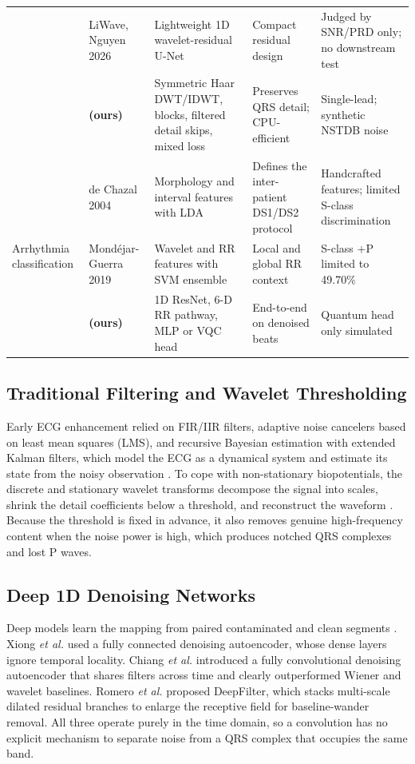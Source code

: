 \begin{table}[!t]
\begin{tabular}{@{}p{2.0cm}p{3.1cm}p{3.9cm}p{3.3cm}p{4.0cm}@{}}
& LiWave, Nguyen 2026 \cite{nguyen2026liwave} & Lightweight 1D wavelet-residual U-Net & Compact residual design & Judged by SNR/PRD only; no downstream test \\
& \textbf{\HSL{} (ours)} & Symmetric Haar DWT/IDWT, \RSE{} blocks, filtered detail skips, mixed loss & Preserves QRS detail; CPU-efficient & Single-lead; synthetic NSTDB noise \\
\midrule
\multirow{3}{2.0cm}{Arrhythmia classification}
& de Chazal 2004 \cite{dechazal2004} & Morphology and interval features with LDA & Defines the inter-patient DS1/DS2 protocol & Handcrafted features; limited S-class discrimination \\
& Mond{\'e}jar-Guerra 2019 \cite{mondejar2019} & Wavelet and RR features with SVM ensemble & Local and global RR context & S-class +P limited to 49.70\% \\
& \textbf{\RRN{} (ours)} & 1D ResNet, 6-D RR pathway, MLP or VQC head & End-to-end on denoised beats & Quantum head only simulated \\
\bottomrule
\end{tabular}
\end{table}

\subsection{Traditional Filtering and Wavelet Thresholding}
Early ECG enhancement relied on FIR/IIR filters, adaptive noise cancelers based on least mean squares (LMS), and recursive Bayesian estimation with extended Kalman filters, which model the ECG as a dynamical system and estimate its state from the noisy observation \cite{clifford2006,goldberger2000}. To cope with non-stationary biopotentials, the discrete and stationary wavelet transforms decompose the signal into scales, shrink the detail coefficients below a threshold, and reconstruct the waveform \cite{clifford2006}. Because the threshold is fixed in advance, it also removes genuine high-frequency content when the noise power is high, which produces notched QRS complexes and lost P waves.

\subsection{Deep 1D Denoising Networks}
Deep models learn the mapping from paired contaminated and clean segments \cite{vincent2008}. Xiong \emph{et al.} \cite{xiong2016} used a fully connected denoising autoencoder, whose dense layers ignore temporal locality. Chiang \emph{et al.} \cite{chiang2019} introduced a fully convolutional denoising autoencoder that shares filters across time and clearly outperformed Wiener and wavelet baselines. Romero \emph{et al.} \cite{romero2021} proposed DeepFilter, which stacks multi-scale dilated residual branches to enlarge the receptive field for baseline-wander removal. All three operate purely in the time domain, so a convolution has no explicit mechanism to separate noise from a QRS complex that occupies the same band.

